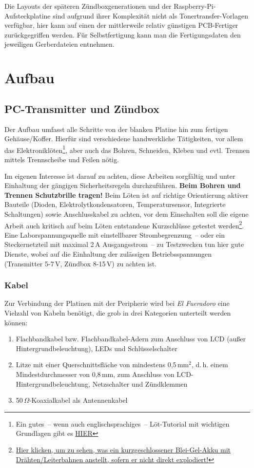 \documentclass[paper=a4, parskip, numbers=noenddot, toc=listof, headsepline]{scrbook}
\newcommand{\anlage}{\emph{El Fueradoro}}
\begin{document}
		Die Layouts der späteren Zündboxgenerationen und der Raspberry-Pi-Aufsteckplatine sind aufgrund ihrer Komplexität nicht als Tonertransfer-Vorlagen verfügbar, hier kann auf einen der mittlerweile relativ günstigen PCB-Fertiger zurückgegriffen werden. Für Selbstfertigung kann man die Fertigungsdaten den jeweiligen Gerberdateien entnehmen.

	\chapter{Aufbau}

		\section{PC-Transmitter und Zündbox}

			Der Aufbau umfasst alle Schritte von der blanken Platine hin zum fertigen Gehäuse/Koffer. Hierfür sind verschiedene handwerkliche Tätigkeiten, vor allem das Elektroniklöten\footnote{Ein gutes~-- wenn auch englischsprachiges~-- Löt-Tutorial mit wichtigen Grundlagen gibt es \href{https://www.youtube.com/watch?v=I_NU2ruzyc4}{HIER}}, aber auch das Bohren, Schneiden, Kleben und evtl. Trennen mittels Trennscheibe und Feilen nötig.

			Im eigenen Interesse ist darauf zu achten, diese Arbeiten sorgfältig und unter Einhaltung der gängigen Sicherheitsregeln durchzuführen. \textbf{Beim Bohren und Trennen Schutzbrille tragen!} Beim Löten ist auf richtige Orientierung aktiver Bauteile (Dioden, Elektrolytkondensatoren, Temperatursensor, Integrierte Schaltungen) sowie Anschlusskabel zu achten, vor dem Einschalten soll die eigene Arbeit auch kritisch auf beim Löten entstandene Kurzschlüsse getestet werden\footnote{\href{http://www.youtube.com/watch?v=79dauuviLe4}{Hier klicken, um zu sehen, was ein kurzgeschlossener Blei-Gel-Akku mit Drähten/Leiterbahnen anstellt, sofern er nicht direkt explodiert!}}. Eine Laborspannungsquelle mit einstellbarer Strombegrenzung~-- oder ein Steckernetzteil mit maximal 2\,A Ausgangsstrom~-- zu Testzwecken tun hier gute Dienste, wobei auf die Einhaltung der zulässigen Betriebsspannungen (Transmitter 5-7\,V, Zündbox 8-15\,V) zu achten ist.

			\subsection{Kabel}

				Zur Verbindung der Platinen mit der Peripherie wird bei {\anlage} eine Vielzahl von Kabeln benötigt, die grob in drei Kategorien unterteilt werden können:
				\begin{enumerate}
					\item
					      Flachbandkabel bzw. Flachbandkabel-Adern zum Anschluss von LCD (außer Hintergrundbeleuchtung), LEDs und Schlüsselschalter
					\item
					      Litze mit einer Querschnittsfläche von mindestens 0,5\,mm$^2$, d.\,h. einem Mindestdurchmesser von 0,8\,mm, zum Anschluss von LCD-Hintergrundbeleuchtung, Netzschalter und
					      Zündklemmen
					\item
					      50\,$\Omega$-Koaxialkabel als Antennenkabel
				\end{enumerate}
\end{document}
